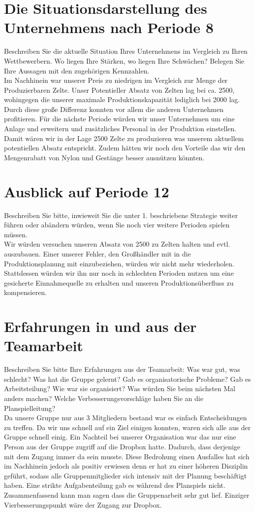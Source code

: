 \documentclass[a4paper, 12pt]{article}
\begin{document}
\section{Die Situationsdarstellung des Unternehmens nach Periode 8}  
Beschreiben Sie die aktuelle Situation Ihres Unternehmens im Vergleich zu Ihren Wettbewerbern. Wo liegen Ihre Stärken, wo liegen Ihre Schwächen? Belegen Sie Ihre Aussagen mit den zugehörigen Kennzahlen.
\\
Im Nachhinein war unserer Preis zu niedrigen im Vergleich zur Menge der Produzierbaren Zelte.
Unser Potentieller Absatz von Zelten lag bei ca. 2500, wohingegen die unserer maximale Produktionskapazität lediglich bei 2000 lag.
Durch diese große Differenz konnten vor allem die anderen Unternehmen profitieren.
Für die nächste Periode würden wir unser Unternehmen um eine Anlage und erweitern und zusätzliches Personal in der Produktion einstellen.
Damit wären wir in der Lage 2500 Zelte zu produzieren was unserem aktuellem potentiellen Absatz entspricht.
Zudem hätten wir noch den Vorteile das wir den Mengenrabatt von Nylon und Gestänge besser ausnützen könnten.

\section{Ausblick auf Periode 12}
Beschreiben Sie bitte, inwieweit Sie die unter 1. beschriebene Strategie weiter führen oder abändern würden, wenn Sie noch vier weitere Perioden spielen müssen.
\\
Wir würden versuchen unseren Absatz von 2500 zu Zelten halten und evtl. auszubauen.
Einer unserer Fehler, den Großhändler mit in die Produktionsplanung mit einzubeziehen, würden wir nicht mehr wiederholen.
Stattdessen würden wir ihn nur noch in schlechten Perioden nutzen um eine gesicherte Einnahmequelle zu erhalten und unseren Produktionsüberfluss zu kompensieren.


\section{Erfahrungen in und aus der Teamarbeit}
Beschreiben Sie bitte Ihre Erfahrungen aus der Teamarbeit:
Was war gut, was schlecht?
Was hat die Gruppe gelernt?
Gab es organisatorische Probleme?
Gab es Arbeitsteilung? Wie war sie organisiert?
Was würden Sie beim nächsten Mal anders machen?
Welche Verbesserungsvorschläge haben Sie an die Planspielleitung?
\\
Da unsere Gruppe nur aus 3 Mitgliedern bestand war es einfach Entscheidungen zu treffen.
Da wir uns schnell auf ein Ziel einigen konnten, waren sich alle aus der Gruppe schnell einig.
Ein Nachteil bei unserer Organisation war das nur eine Person aus der Gruppe zugriff auf die Dropbox hatte.
Dadurch, dass derjenige mit dem Zugang immer da sein musste.
Diese Bedrohung einen Ausfalles hat sich im Nachhinein jedoch als positiv erwiesen denn er hat zu einer höheren Disziplin geführt, sodass alle Gruppenmitglieder sich intensiv mit der Planung beschäftigt haben.
Eine strikte Aufgabenteilung gab es während des Planspiels nicht.
Zusammenfassend kann man sagen dass die Gruppenarbeit sehr gut lief.
Einziger Vierbesserungspunkt wäre  der Zugang zur Dropbox. 
\end{document}
